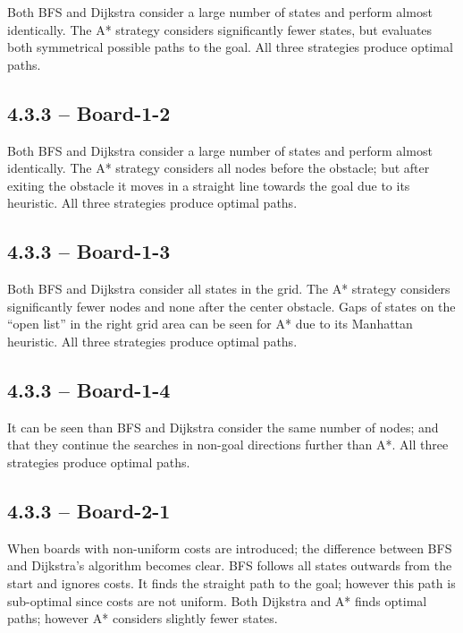 Both \ac{BFS} and Dijkstra consider a large number of states and perform almost identically. The A* strategy considers significantly fewer states, but evaluates both symmetrical possible paths to the goal. All three strategies produce optimal paths.


\newpage
\subsection*{4.3.3 -- Board-1-2}

Both \ac{BFS} and Dijkstra consider a large number of states and perform almost identically. The A* strategy considers all nodes before the obstacle; but after exiting the obstacle it moves in a straight line towards the goal due to its heuristic. All three strategies produce optimal paths.


\newpage
\subsection*{4.3.3 -- Board-1-3}

Both \ac{BFS} and Dijkstra consider all states in the grid. The A* strategy considers significantly fewer nodes and none after the center obstacle. Gaps of states on the ``open list'' in the right grid area can be seen for A* due to its Manhattan heuristic. All three strategies produce optimal paths.


\newpage
\subsection*{4.3.3 -- Board-1-4}

It can be seen than \ac{BFS} and Dijkstra consider the same number of nodes; and that they continue the searches in non-goal directions further than A*. All three strategies produce optimal paths.


\newpage
\subsection*{4.3.3 -- Board-2-1}

When boards with non-uniform costs are introduced; the difference between \ac{BFS} and Dijkstra's algorithm becomes clear. \ac{BFS} follows all states outwards from the start and ignores costs. It finds the straight path to the goal; however this path is sub-optimal since costs are not uniform. Both Dijkstra and A* finds optimal paths; however A* considers slightly fewer states.

